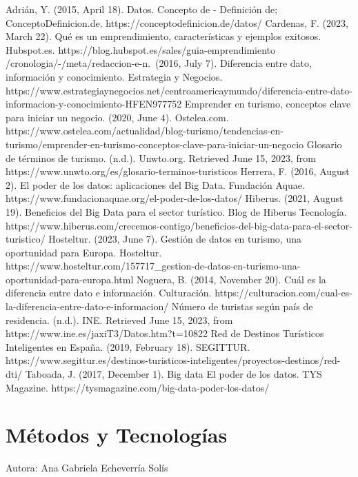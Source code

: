 \documentclass[
  letterpaper,
  DIV=11,
  numbers=noendperiod]{scrreprt}
\begin{document}
Adrián, Y. (2015, April 18). Datos. Concepto de - Definición de;
ConceptoDefinicion.de. https://conceptodefinicion.de/datos/ Cardenas, F.
(2023, March 22). Qué es un emprendimiento, características y ejemplos
exitosos. Hubspot.es. https://blog.hubspot.es/sales/guia-emprendimiento
/cronologia/-/meta/redaccion-e-n.~(2016, July 7). Diferencia entre dato,
información y conocimiento. Estrategia y Negocios.
https://www.estrategiaynegocios.net/centroamericaymundo/diferencia-entre-dato-informacion-y-conocimiento-HFEN977752
Emprender en turismo, conceptos clave para iniciar un negocio. (2020,
June 4). Ostelea.com.
https://www.ostelea.com/actualidad/blog-turismo/tendencias-en-turismo/emprender-en-turismo-conceptos-clave-para-iniciar-un-negocio
Glosario de términos de turismo. (n.d.). Unwto.org. Retrieved June 15,
2023, from https://www.unwto.org/es/glosario-terminos-turisticos
Herrera, F. (2016, August 2). El poder de los datos: aplicaciones del
Big Data. Fundación Aquae.
https://www.fundacionaquae.org/el-poder-de-los-datos/ Hiberus. (2021,
August 19). Beneficios del Big Data para el sector turístico. Blog de
Hiberus Tecnología.
https://www.hiberus.com/crecemos-contigo/beneficios-del-big-data-para-el-sector-turistico/
Hosteltur. (2023, June 7). Gestión de datos en turismo, una oportunidad
para Europa. Hosteltur.
https://www.hosteltur.com/157717\_gestion-de-datos-en-turismo-una-oportunidad-para-europa.html
Noguera, B. (2014, November 20). Cuál es la diferencia entre dato e
información. Culturación.
https://culturacion.com/cual-es-la-diferencia-entre-dato-e-informacion/
Número de turistas según país de residencia. (n.d.). INE. Retrieved June
15, 2023, from https://www.ine.es/jaxiT3/Datos.htm?t=10822 Red de
Destinos Turísticos Inteligentes en España. (2019, February 18).
SEGITTUR.
https://www.segittur.es/destinos-turisticos-inteligentes/proyectos-destinos/red-dti/
Taboada, J. (2017, December 1). Big data El poder de los datos. TYS
Magazine. https://tysmagazine.com/big-data-poder-los-datos/


\hypertarget{muxe9todos-y-tecnologuxedas}{%
\chapter{Métodos y Tecnologías}\label{muxe9todos-y-tecnologuxedas}}

Autora: Ana Gabriela Echeverría Solís
\end{document}
